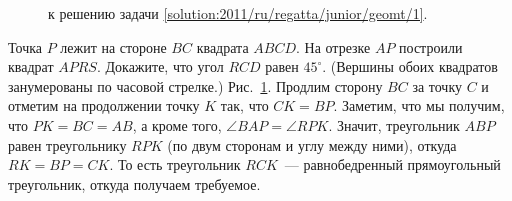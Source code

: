 \ifsolution
\begin{figure}\centering
    \caption{к решению задачи \ref{solution:2011/ru/regatta/junior/geomt/1}.}
    \label{fig:solution:2011/ru/regatta/junior/geomt/1}
\end{figure}
\fi %

\problem
Точка $P$ лежит на стороне $BC$ квадрата $ABCD$.
На отрезке $AP$ построили квадрат $APRS$.
Докажите, что угол $RCD$ равен $45^\circ$.
(Вершины обоих квадратов занумерованы по часовой стрелке.)
\solution
\label{solution:2011/ru/regatta/junior/geomt/1}%
Рис.~\ref{fig:solution:2011/ru/regatta/junior/geomt/1}.
Продлим сторону $BC$ за точку $C$ и отметим на продолжении точку $K$ так, что
$C K = B P$.
Заметим, что мы получим, что $PK = BC = AB$, а кроме того,
$\angle BAP = \angle RPK$.
Значит, треугольник $ABP$ равен треугольнику $RPK$
(по двум сторонам и углу между ними),
откуда $RK = BP = CK$.
То есть треугольник $RCK$~--- равнобедренный прямоугольный треугольник, откуда
получаем требуемое.
\endproblem
